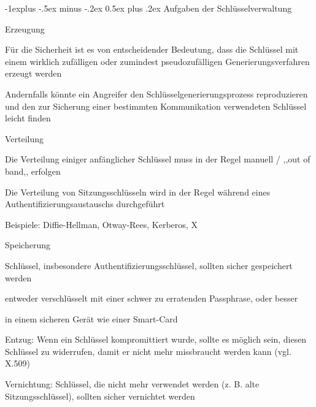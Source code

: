 \documentclass[a4paper]{article}
\makeatletter
\renewcommand{\subsection}{\@startsection{subsection}{2}{0mm}%
 {-1explus -.5ex minus -.2ex}%
 {0.5ex plus .2ex}%
 {\normalfont\normalsize\bfseries}}
\makeatother
\begin{document}
\begin{multicols}{3}
      \subsection{Aufgaben der Schlüsselverwaltung}
      \begin{itemize*}
            \item Erzeugung
            \begin{itemize*}
                  \item Für die Sicherheit ist es von entscheidender Bedeutung, dass die Schlüssel mit einem wirklich zufälligen oder zumindest pseudozufälligen Generierungsverfahren erzeugt werden
                  \item Andernfalls könnte ein Angreifer den Schlüsselgenerierungsprozess reproduzieren und den zur Sicherung einer bestimmten Kommunikation verwendeten Schlüssel leicht finden
            \end{itemize*}
            \item Verteilung
            \begin{itemize*}
                  \item Die Verteilung einiger anfänglicher Schlüssel muss in der Regel manuell / ,,out of band,, erfolgen
                  \item Die Verteilung von Sitzungsschlüsseln wird in der Regel während eines Authentifizierungsaustauschs durchgeführt
                  \item Beispiele: Diffie-Hellman, Otway-Rees, Kerberos, X
            \end{itemize*}
            \item Speicherung
            \begin{itemize*}
                  \item Schlüssel, insbesondere Authentifizierungsschlüssel, sollten sicher gespeichert werden
                  \item entweder verschlüsselt mit einer schwer zu erratenden Passphrase, oder besser
                  \item in einem sicheren Gerät wie einer Smart-Card
            \end{itemize*}
            \item Entzug: Wenn ein Schlüssel kompromittiert wurde, sollte es möglich sein, diesen Schlüssel zu widerrufen, damit er nicht mehr missbraucht werden kann (vgl. X.509)
            \item Vernichtung: Schlüssel, die nicht mehr verwendet werden (z. B. alte Sitzungsschlüssel), sollten sicher vernichtet werden

\end{itemize*}
\end{multicols}
\end{document}
